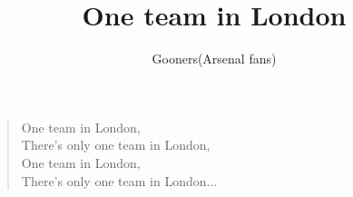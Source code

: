 \documentclass[a4paper,12pt]{article}
\title{One team in London}
\author{Gooners(Arsenal fans)}
\date{}
\begin{document}
	
	\maketitle
	
	\begin{verse}
		
		One team in London, \\
		There's only one team in London, \\
		One team in London, \\
		There's only one team in London$\ldots$
		
	\end{verse}
	
\end{document}

